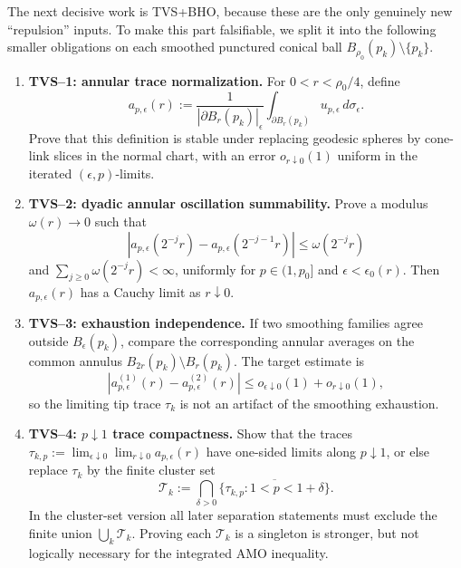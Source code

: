 \begin{remark}
\label{rem:TipNeckSubatomicRoadmap}
The next decisive work is TVS+BHO, because these are the only genuinely new
``repulsion'' inputs.  To make this part falsifiable, we split it into the
following smaller obligations on each smoothed punctured conical ball
\(B_{\rho_0}(p_k)\setminus\{p_k\}\).
\begin{enumerate}
    \item \textbf{TVS--1: annular trace normalization.}
    For \(0<r<\rho_0/4\), define
    \[
        a_{p,\epsilon}(r)
        :=
        \frac{1}{|\partial B_r(p_k)|_{\epsilon}}
        \int_{\partial B_r(p_k)}u_{p,\epsilon}\,d\sigma_\epsilon .
    \]
    Prove that this definition is stable under replacing geodesic spheres by
    cone-link slices in the normal chart, with an error \(o_{r\downarrow0}(1)\)
    uniform in the iterated \((\epsilon,p)\)-limits.

    \item \textbf{TVS--2: dyadic annular oscillation summability.}
    Prove a modulus \(\omega(r)\to0\) such that
    \[
        |a_{p,\epsilon}(2^{-j}r)-a_{p,\epsilon}(2^{-j-1}r)|
        \le \omega(2^{-j}r)
    \]
    and \(\sum_{j\ge0}\omega(2^{-j}r)<\infty\), uniformly for
    \(p\in(1,p_0]\) and \(\epsilon<\epsilon_0(r)\).  Then
    \(a_{p,\epsilon}(r)\) has a Cauchy limit as \(r\downarrow0\).

    \item \textbf{TVS--3: exhaustion independence.}
    If two smoothing families agree outside \(B_\epsilon(p_k)\), compare the
    corresponding annular averages on the common annulus
    \(B_{2r}(p_k)\setminus B_r(p_k)\).  The target estimate is
    \[
        |a^{(1)}_{p,\epsilon}(r)-a^{(2)}_{p,\epsilon}(r)|
        \le o_{\epsilon\downarrow0}(1)+o_{r\downarrow0}(1),
    \]
    so the limiting tip trace \(\tau_k\) is not an artifact of the smoothing
    exhaustion.

    \item \textbf{TVS--4: \(p\downarrow1\) trace compactness.}
    Show that the traces \(\tau_{k,p}:=\lim_{\epsilon\downarrow0}
    \lim_{r\downarrow0}a_{p,\epsilon}(r)\) have one-sided limits along
    \(p\downarrow1\), or else replace \(\tau_k\) by the finite cluster set
    \[
        \mathcal T_k
        :=
        \bigcap_{\delta>0}
        \overline{\{\tau_{k,p}:1<p<1+\delta\}} .
    \]
    In the cluster-set version all later separation statements must exclude
    the finite union \(\bigcup_k\mathcal T_k\).  Proving each
    \(\mathcal T_k\) is a singleton is stronger, but not logically necessary
    for the integrated AMO inequality.


\end{enumerate}
\end{remark}

